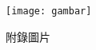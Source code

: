 


\begin{figure}[h]
  \centerline{\texttt{[image: gambar]}}
  \caption*{附錄圖片}
  \label{fig:figure_2}
\end{figure}